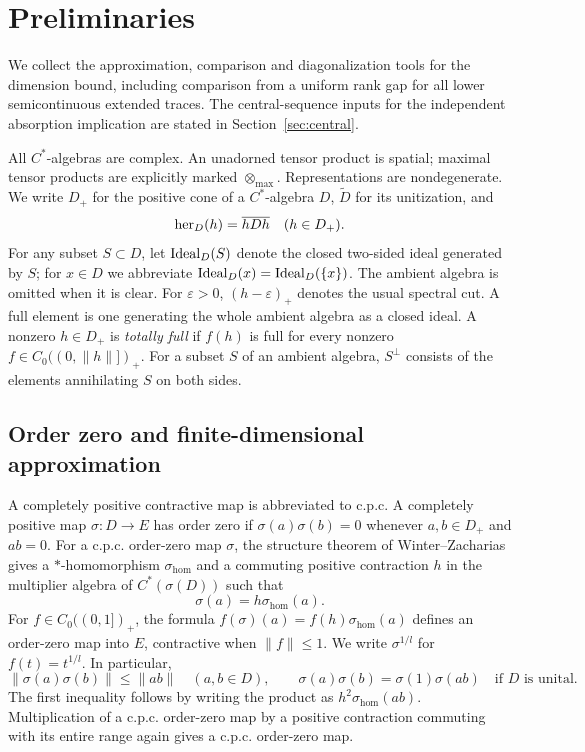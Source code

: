 \section{Preliminaries}
\label{sec:preliminaries}

We collect the approximation, comparison and diagonalization tools for
the dimension bound, including comparison from a uniform rank gap for
all lower semicontinuous extended traces. The central-sequence inputs
for the independent absorption implication are stated in
Section~\ref{sec:central}.

All $C^*$-algebras are complex. An unadorned tensor product is spatial;
maximal tensor products are explicitly marked $\otimes_{\max}$.
Representations are nondegenerate.  We write $D_+$ for the positive cone of
a $C^*$-algebra $D$, $\widetilde D$ for its unitization, and
\[
 \operatorname{her}_D(h)=\overline{hDh}\quad(h\in D_+).
\]
For any subset $S\subset D$, let $\operatorname{Ideal}_D(S)$ denote the closed two-sided
ideal generated by $S$; for $x\in D$ we abbreviate
$\operatorname{Ideal}_D(x)=\operatorname{Ideal}_D(\{x\})$.  The ambient algebra is omitted when it
is clear.  For $\varepsilon>0$,
$(h-\varepsilon)_+$ denotes the usual spectral cut.  A full element is
one generating the whole ambient algebra as a closed ideal.  A nonzero
$h\in D_+$ is \emph{totally full} if $f(h)$ is full for every nonzero
$f\in C_0((0,\|h\|])_+$.  For a subset $S$ of an ambient algebra,
$S^\perp$ consists of the elements annihilating $S$ on both sides.

\subsection{Order zero and finite-dimensional approximation}

A completely positive contractive map is abbreviated to c.p.c.  A
completely positive map $\sigma:D\to E$ has order zero if
$\sigma(a)\sigma(b)=0$ whenever $a,b\in D_+$ and $ab=0$.
For a c.p.c. order-zero map $\sigma$, the structure theorem of Winter--Zacharias
\cite[Theorem~3.3 and Corollaries~4.1--4.2]{WZOrderZero} gives a
$*$-homomorphism $\sigma_{\mathrm{hom}}$ and a commuting positive
contraction $h$ in the multiplier algebra of $C^*(\sigma(D))$ such that
\[
 \sigma(a)=h\sigma_{\mathrm{hom}}(a).
\]
For $f\in C_0((0,1])_+$, the formula
$f(\sigma)(a)=f(h)\sigma_{\mathrm{hom}}(a)$ defines an order-zero map
into $E$, contractive when $\|f\|\le1$.  We write
$\sigma^{1/l}$ for $f(t)=t^{1/l}$.  In particular,
\begin{equation}
 \label{prelim:order-zero}
 \|\sigma(a)\sigma(b)\|\le\|ab\|\quad(a,b\in D),
 \qquad
 \sigma(a)\sigma(b)=\sigma(1)\sigma(ab)
 \quad\text{if $D$ is unital}.
\end{equation}
The first inequality follows by writing the product as
$h^2\sigma_{\mathrm{hom}}(ab)$.  Multiplication of a c.p.c. order-zero map by
a positive contraction commuting with its entire range again gives a
c.p.c. order-zero map.

